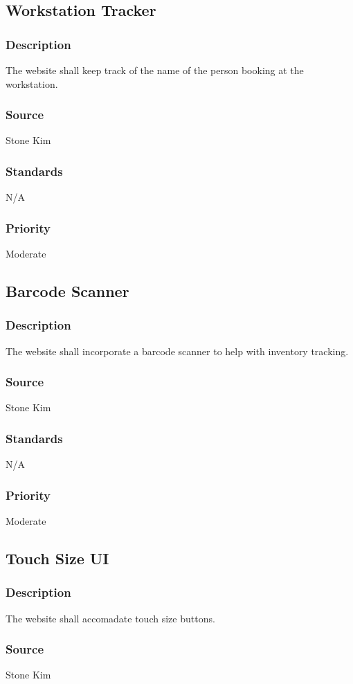 \subsection{Workstation Tracker}
\subsubsection{Description}
The website shall keep track of the name of the person booking at the workstation.
\subsubsection{Source}
Stone Kim
\subsubsection{Standards}
N/A
\subsubsection{Priority}
Moderate

\subsection{Barcode Scanner}
\subsubsection{Description}
The website shall incorporate a barcode scanner to help with inventory tracking.
\subsubsection{Source}
Stone Kim
\subsubsection{Standards}
N/A
\subsubsection{Priority}
Moderate

\subsection{Touch Size UI}
\subsubsection{Description}
The website shall accomadate touch size buttons.
\subsubsection{Source}
Stone Kim
